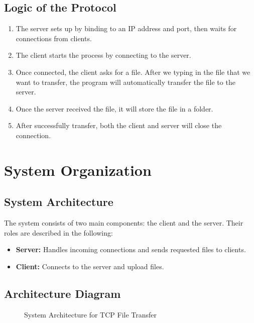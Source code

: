 \documentclass{article}
\begin{document}
\subsection{Logic of the Protocol}
\begin{enumerate}
    \item The server sets up by binding to an IP address and port, then waits for connections from clients.
    \item The client starts the process by connecting to the server.
    \item Once connected, the client asks for a file. After we typing in the file that we want to transfer, the program will automatically transfer the file to the server.
    \item Once the server received the file, it will store the file in a folder.
    \item After successfully transfer, both the client and server will close the connection.
\end{enumerate}

\section{System Organization}
\subsection{System Architecture}
The system consists of two main components: the client and the server. Their roles are described in the following:
\begin{itemize}
    \item \textbf{Server:} Handles incoming connections and sends requested files to clients.
    \item \textbf{Client:} Connects to the server and upload files.
\end{itemize}

\subsection{Architecture Diagram}
\begin{figure}[h]
    \centering
    \caption{System Architecture for TCP File Transfer}
    \label{fig:system}
\end{figure}
\end{document}
